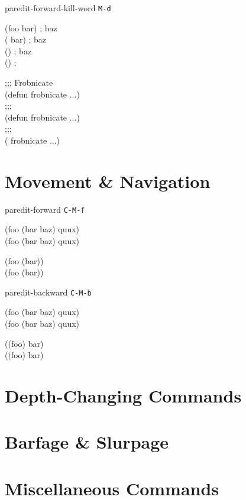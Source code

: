 \documentclass[landscape,a3paper]{article}
\begin{document}
\begin{multicols}{4}
paredit-forward-kill-word \texttt{M-d}

\ttfamily
\cursor(foo bar) \space \space \space ; baz\\
(\cursor{} bar) \space \space \space ; baz\\
(\cursor) \space \space \space ; baz\\
() \space \space \space ;\cursor

;;;\cursor{} Frobnicate\\
(defun frobnicate ...)\\
;;;\cursor\\
(defun frobnicate ...)\\
;;;\\
(\cursor{} frobnicate ...)
\rmfamily

    \section*{Movement \& Navigation}

paredit-forward \texttt{C-M-f}

\ttfamily
(foo \cursor(bar baz) quux)\\
(foo (bar baz)\cursor{} quux)

(foo (bar)\cursor)\\
(foo (bar))\cursor
\rmfamily

paredit-backward \texttt{C-M-b}

\ttfamily
(foo (bar baz)\cursor{} quux)\\
(foo \cursor(bar baz) quux)

(\cursor(foo) bar)\\
\cursor((foo) bar)
\rmfamily

    \section*{Depth-Changing Commands}

    \section*{Barfage \& Slurpage}

    \section*{Miscellaneous Commands}

  \end{multicols}
\end{document}
